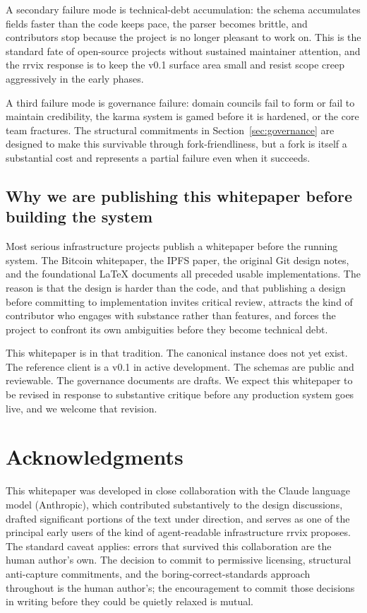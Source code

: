 \documentclass[11pt]{rrvix}
\begin{document}
A secondary failure mode is technical-debt accumulation: the schema accumulates fields faster than the code keeps pace, the parser becomes brittle, and contributors stop because the project is no longer pleasant to work on. This is the standard fate of open-source projects without sustained maintainer attention, and the rrvix response is to keep the v0.1 surface area small and resist scope creep aggressively in the early phases.

A third failure mode is governance failure: domain councils fail to form or fail to maintain credibility, the karma system is gamed before it is hardened, or the core team fractures. The structural commitments in Section~\ref{sec:governance} are designed to make this survivable through fork-friendliness, but a fork is itself a substantial cost and represents a partial failure even when it succeeds.

\subsection{Why we are publishing this whitepaper before building the system}

Most serious infrastructure projects publish a whitepaper before the running system. The Bitcoin whitepaper, the IPFS paper, the original Git design notes, and the foundational LaTeX documents all preceded usable implementations. The reason is that the design is harder than the code, and that publishing a design before committing to implementation invites critical review, attracts the kind of contributor who engages with substance rather than features, and forces the project to confront its own ambiguities before they become technical debt.

This whitepaper is in that tradition. The canonical instance does not yet exist. The reference client is a v0.1 in active development. The schemas are public and reviewable. The governance documents are drafts. We expect this whitepaper to be revised in response to substantive critique before any production system goes live, and we welcome that revision.

\section*{Acknowledgments}

This whitepaper was developed in close collaboration with the Claude language model (Anthropic), which contributed substantively to the design discussions, drafted significant portions of the text under direction, and serves as one of the principal early users of the kind of agent-readable infrastructure rrvix proposes. The standard caveat applies: errors that survived this collaboration are the human author's own. The decision to commit to permissive licensing, structural anti-capture commitments, and the boring-correct-standards approach throughout is the human author's; the encouragement to commit those decisions in writing before they could be quietly relaxed is mutual.
\end{document}
